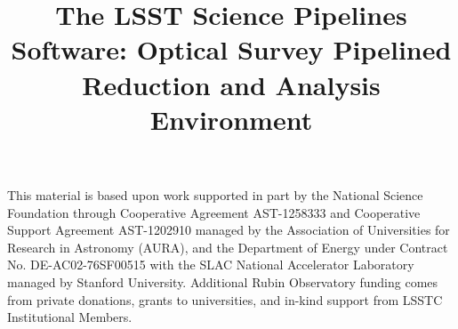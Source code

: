 \documentclass[twocolumn]{aastex631}
\begin{document}
\title{The LSST Science Pipelines Software: Optical Survey Pipelined Reduction and Analysis Environment}





















\begin{acknowledgments}
This material is based upon work supported in part by the National Science Foundation through Cooperative Agreement AST-1258333 and Cooperative Support Agreement AST-1202910 managed by the Association of Universities for Research in Astronomy (AURA), and the Department of Energy under Contract No. DE-AC02-76SF00515 with the SLAC National Accelerator Laboratory managed by Stanford University.
Additional Rubin Observatory funding comes from private donations, grants to universities, and in-kind support from LSSTC Institutional Members.
\end{acknowledgments}



\end{document}
